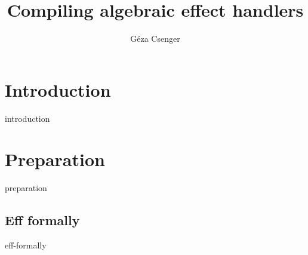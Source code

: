 \documentclass[oneside]{book}
\title{Compiling algebraic effect handlers}
\author{Géza Csenger}
\date{}
\begin{document}
\maketitle
\tableofcontents

\chapter{Introduction}
{introduction}

\chapter{Preparation}
{preparation}

\begin{appendices}
    \chapter{Eff formally}
    {eff-formally}
\end{appendices}

{}

\end{document}
